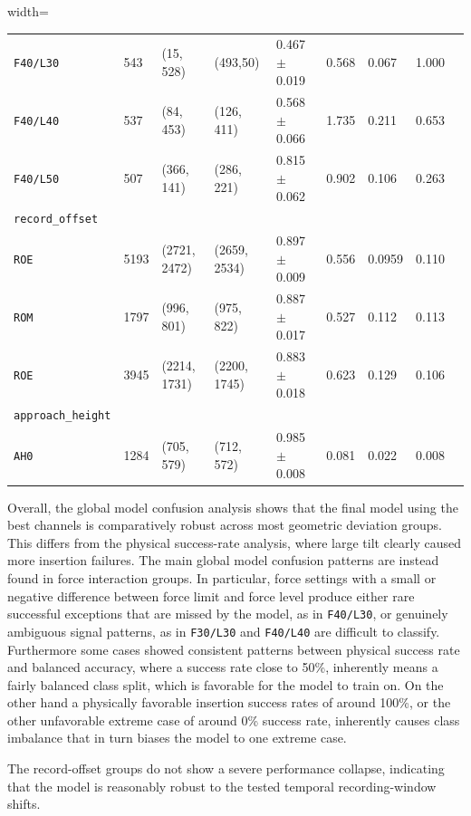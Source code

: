 \begin{table}[htbp]
\begin{adjustbox}{width=\textwidth}
\begin{tabular}{lllllllll}
        \texttt{F40/L30} & 543 & (15, 528) & (493,50) & 0.467 $\pm$ 0.019 & 0.568 & 0.067 & 1.000 \\
        \texttt{F40/L40} & 537 & (84, 453) & (126, 411) & 0.568 $\pm$ 0.066 & 1.735 & 0.211 & 0.653 \\
        \texttt{F40/L50} & 507 & (366, 141) & (286, 221) & 0.815 $\pm$ 0.062 & 0.902 & 0.106 & 0.263 \\
        \midrule
        \texttt{record\_offset} \\
        \texttt{ROE} & 5193 & (2721, 2472) & (2659, 2534) & 0.897 $\pm$ 0.009 & 0.556 & 0.0959 & 0.110 \\
        \texttt{ROM} & 1797 & (996, 801) & (975, 822) & 0.887 $\pm$ 0.017 & 0.527 & 0.112 & 0.113 \\
        \texttt{ROE} & 3945 & (2214, 1731) & (2200, 1745) & 0.883 $\pm$ 0.018 & 0.623 & 0.129 & 0.106 \\
        \midrule
        \texttt{approach\_height} \\
        \texttt{AH0} & 1284 & (705, 579) & (712, 572) & 0.985 $\pm$ 0.008 & 0.081 & 0.022 & 0.008 \\
        \bottomrule
    \end{tabular}
    \end{adjustbox}
\end{table}


Overall, the global model confusion analysis shows that the final model using the best channels is comparatively robust across most geometric deviation groups. This differs from the physical success-rate analysis, where large tilt clearly caused more insertion failures. The main global model confusion patterns are instead found in force interaction groups. In particular, force settings with a small or negative difference between force limit and force level produce either rare successful exceptions that are missed by the model, as in \texttt{F40/L30}, or genuinely ambiguous signal patterns, as in \texttt{F30/L30} and \texttt{F40/L40} are difficult to classify. Furthermore some cases showed consistent patterns between physical success rate and balanced accuracy, where a success rate close to 50\%, inherently means a fairly balanced class split, which is favorable for the model to train on. On the other hand a physically favorable insertion success rates of around 100\%, or the other unfavorable extreme case of around 0\% success rate, inherently causes class imbalance that in turn biases the model to one extreme case.

The record-offset groups do not show a severe performance collapse, indicating that the model is reasonably robust to the tested temporal recording-window shifts.

